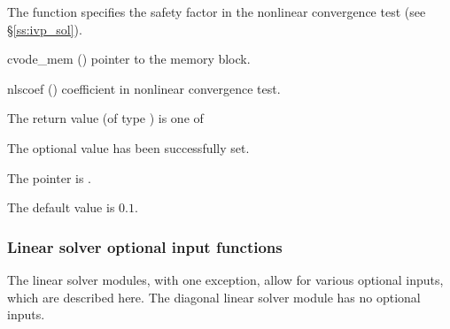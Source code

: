 {
  The function  specifies the safety factor
  in the nonlinear convergence test (see \S\ref{ss:ivp_sol}).
}
{
  \begin{args}
  \item[cvode\_mem] ()
    pointer to the {\cvode} memory block.
  \item[nlscoef] ()
    coefficient in nonlinear convergence test.
  \end{args}
}
{
  The return value  (of type ) is one of
  \begin{args}
  \item[\Id{SUCCESS}] 
    The optional value has been successfully set.
  \item[\Id{CVS\_NO\_MEM}]
    The  pointer is .
  \end{args}
}
{
  The default value is $0.1$.
}
\subsubsection{Linear solver optional input functions}
The linear solver modules, with one exception, allow for various optional 
inputs, which are described here. The diagonal linear solver module has no
optional inputs.

